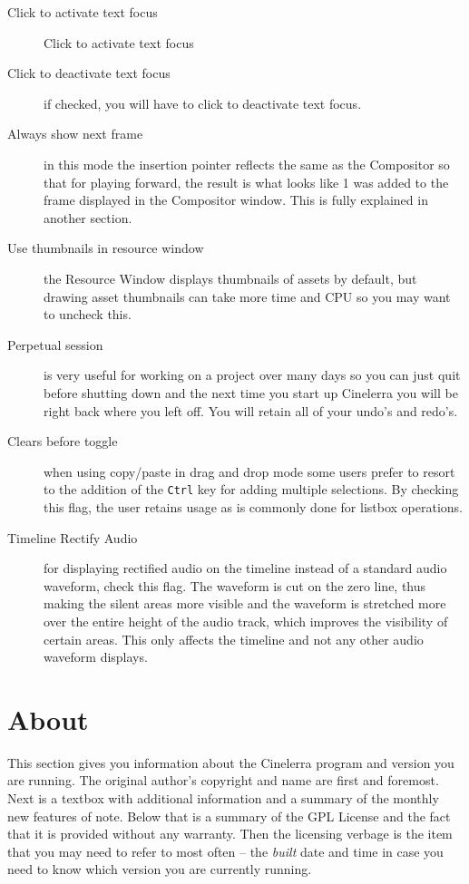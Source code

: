 \begin{description}
    \item[Click to activate text focus] Click to activate text focus
    \item [Click to deactivate text focus] if checked, you will have to click to deactivate text focus.
    \item[Always show next frame] in this mode the insertion pointer reflects the same as the Compositor so that for playing forward, the result is what looks like 1 was added to the frame displayed in the Compositor window.  This is fully explained in another section.
    \item[Use thumbnails in resource window] the Resource Window displays thumbnails of assets by default, but drawing asset thumbnails can take more time and CPU so you may want to uncheck this.
    \item[Perpetual session] is very useful for working on a project over many days so you can just quit before
    shutting down and the next time you start up Cinelerra you will be right back where you left off. You
    will retain all of your undo's and redo's.
    \item[Clears before toggle] when using copy/paste in drag and drop mode some users prefer to resort to the addition of the \texttt{Ctrl} key for adding multiple selections.  By checking this flag, the user retains usage as is commonly done for listbox operations.
    \item[Timeline Rectify Audio] for displaying rectified audio on the timeline instead of a standard audio waveform, check this flag.  The waveform is cut on the zero line, thus making the silent areas more visible and the waveform is stretched more over the entire height of the audio track, which improves the visibility of certain areas. This only affects the timeline and not any other audio waveform displays.
\end{description}

\section{About}%
\label{sec:about}

This section gives you information about the Cinelerra program and version you are running.  The original author’s copyright and name are first and foremost.  Next is a textbox with additional information and a summary of the monthly new features of note. Below that is a summary of the GPL License and the fact that it is provided without any warranty.  Then the licensing verbage is the item that you may need to refer to most often -- the \textit{built} date and time in case you need to know which version you are currently running.

